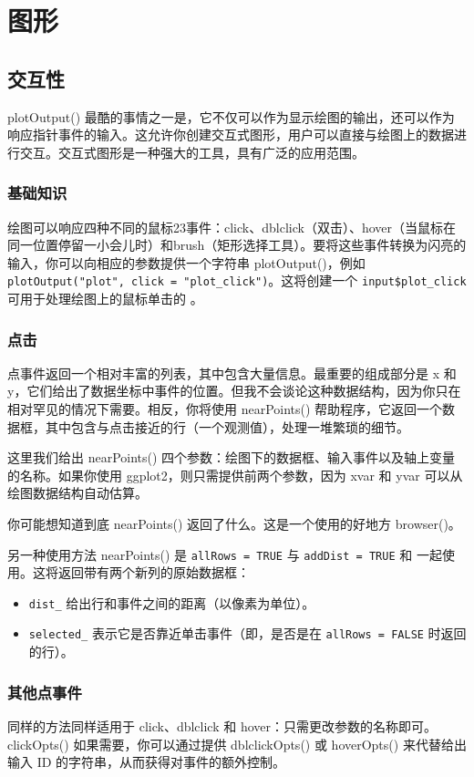 \chapter{图形\label{ch07}}
\section{交互性}
plotOutput() 最酷的事情之一是，它不仅可以作为显示绘图的输出，还可以作为响应指针事件的输入。这允许你创建交互式图形，用户可以直接与绘图上的数据进行交互。交互式图形是一种强大的工具，具有广泛的应用范围。
\subsection{基础知识}
绘图可以响应四种不同的鼠标23事件：click、dblclick（双击）、hover（当鼠标在同一位置停留一小会儿时）和brush（矩形选择工具）。要将这些事件转换为闪亮的输入，你可以向相应的参数提供一个字符串 plotOutput()，例如 \verb|plotOutput("plot", click = "plot_click")|。这将创建一个 \verb|input$plot_click| 可用于处理绘图上的鼠标单击的 。

\subsection{点击}
点事件返回一个相对丰富的列表，其中包含大量信息。最重要的组成部分是 x 和 y，它们给出了数据坐标中事件的位置。但我不会谈论这种数据结构，因为你只在相对罕见的情况下需要。相反，你将使用 nearPoints() 帮助程序，它返回一个数据框，其中包含与点击接近的行（一个观测值），处理一堆繁琐的细节。

这里我们给出 nearPoints() 四个参数：绘图下的数据框、输入事件以及轴上变量的名称。如果你使用 ggplot2，则只需提供前两个参数，因为 xvar 和 yvar 可以从绘图数据结构自动估算。

你可能想知道到底 nearPoints() 返回了什么。这是一个使用的好地方 browser()。

另一种使用方法 nearPoints() 是 \verb|allRows = TRUE| 与 \verb|addDist = TRUE| 和 一起使用。这将返回带有两个新列的原始数据框：
\begin{itemize}
    \item \verb|dist_| 给出行和事件之间的距离（以像素为单位）。
    \item \verb|selected_| 表示它是否靠近单击事件（即，是否是在 \verb|allRows = FALSE| 时返回的行）。
\end{itemize}
\subsection{其他点事件}
同样的方法同样适用于 click、dblclick 和 hover：只需更改参数的名称即可。clickOpts() 如果需要，你可以通过提供 dblclickOpts() 或 hoverOpts() 来代替给出输入 ID 的字符串，从而获得对事件的额外控制。

